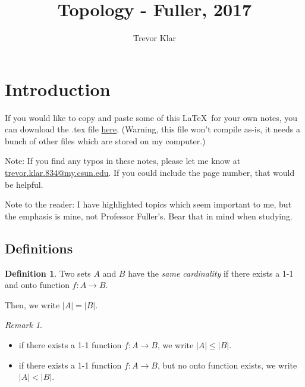 \documentclass[a5paper]{article}
\title{Topology - Fuller, 2017}
\author{Trevor Klar}
\theoremstyle{definition}%
\newtheorem*{definition*}{Definition}
\numberwithin{exercise}{section}
\theoremstyle{remark}%
\newtheorem*{remark*}{Remark}
\begin{document}
\maketitle

\tableofcontents

\section*{Introduction}

\begin{mdframed}[backgroundcolor=blue!20]
If you would like to copy and paste some of this \LaTeX \, for your own notes, you can download the .tex file \href{https://goo.gl/GYnmeX}{here}. (Warning, this file won't compile as-is, it needs a bunch of other files which are stored on my computer.)
\end{mdframed}

\begin{highlight}
Note: If you find any typos in these notes, please let me know at \\ \href{mailto:trevor.klar.834@my.csun.edu}{trevor.klar.834@my.csun.edu}. If you could include the page number, that would be helpful. 

Note to the reader: I have highlighted topics which seem important to me, but the emphasis is mine, not Professor Fuller's. Bear that in mind when studying. 
\end{highlight}

\subsection{Definitions}

\begin{definition*}
Two sets $A$ and $B$ have the \emph{same cardinality} if there exists a 1-1 and onto function $f:A \to B$. 

Then, we write $|A| = |B|$.
\end{definition*}

\begin{remark*} 
\begin{itemize}
\item if there exists a 1-1 function $f:A \to B$, we write $|A| \leq |B|$.
\item if there exists a 1-1 function $f:A \to B$, but no onto function exists, we write $|A| < |B|$.
\end{itemize}
\end{remark*}
\end{document}

